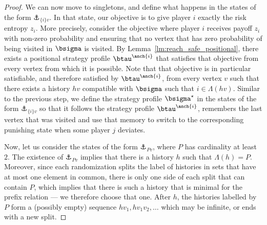 \begin{proof}
    We can now move to singletons, and define what happens in the states of the form $\anchor_{\{i\} v}$.
    In that state, our objective is to give player $i$ exactly the risk entropy $z_i$.
    More precisely, consider the objective where player $i$ receives payoff $z_i$ with non-zero probability and ensuring that no vertex that has zero probability of being visited in $\bsigma$ is visited.    
    By Lemma~\ref{lm:reach_safe_positional}, there exists a positional strategy profile $\btau^{\anch \{i\}}$ that satisfies that objective from every vertex from which it is possible.
    Note that that objective is in particular satisfiable, and therefore satisfied by $\btau^{\anch \{i\}}$, from every vertex $v$ such that there exists a history $hv$ compatible with $\bsigma$ such that $i \in \Lambda(hv)$.
    Similar to the previous step, we define the strategy profile $\bsigma^\star$ in the states of the form $\anchor_{\{i\} v}$ so that it follows the strategy profile $\btau^{\anch \{i\}}$, remembers the last vertex that was visited and use that memory to switch to the corresponding punishing state when some player $j$ deviates.

    Now, let us consider the states of the form $\anchor_{P v}$, where $P$ has cardinality at least $2$.
    The existence of $\anchor_{P v}$ implies that there is a history $h$ such that $\Lambda(h) = P$.
    Moreover, since each randomization splits the label of histories in sets that have at most one element in common, there is only one side of each split that can contain $P$, which implies that there is such a history that is minimal for the prefix relation --- we therefore choose that one.
    After $h$, the histories labelled by $P$ form a (possibly empty) sequence $hv_1, hv_1v_2, \dots$ which may be infinite, or ends with a new split.
    


\end{proof}
